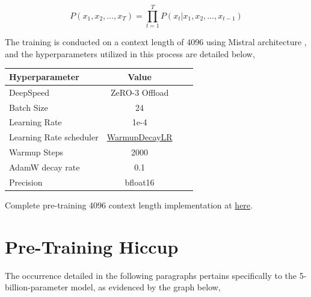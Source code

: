 \documentclass[preprint]{article}
\begin{document}
\[
  P(x_1, x_2, \ldots, x_T) = \prod_{t=1}^{T} P(x_t | x_1, x_2, \ldots, x_{t-1})
\]



The training is conducted on a context length of 4096 using Mistral architecture \cite{jiang2023mistral}, and the hyperparameters utilized in this process are detailed below,

\begin{table}[h]
  \centering
  \begin{tabular}{lccl}
    \hline
    \textbf{Hyperparameter} & \textbf{Value}                                                                                 \\
    \hline
    DeepSpeed               & ZeRO-3 Offload                                                                                 \\
    Batch Size              & 24                                                                                             \\
    Learning Rate           & 1e-4                                                                                           \\
    Learning Rate scheduler & \href{https://deepspeed.readthedocs.io/en/latest/schedulers.html#warmupdecaylr}{WarmupDecayLR} \\
    Warmup Steps            & 2000                                                                                           \\
    AdamW decay rate        & 0.1                                                                                            \\
    Precision               & bfloat16                                                                                       \\
    \hline
  \end{tabular}
\end{table}

Complete pre-training 4096 context length implementation at \href{https://github.com/mesolitica/malaya/wiki/MaLLaM-%F0%9F%8C%99-Malaysia-Large-Language-Model#training-scripts-and-sessions}{here}.

\section{Pre-Training Hiccup}

The occurrence detailed in the following paragraphs pertains specifically to the 5-billion-parameter model, as evidenced by the graph below,
\end{document}
